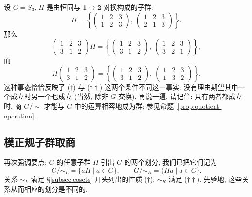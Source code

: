 \begin{example}
\label{ex:cosets-S3}
设 $G = S_3$, $H$ 是由恒同与 $\mathbf{1} \leftrightarrow \mathbf{2}$ 对换构成的子群:
\[
H = \left\{ \begin{pmatrix} 1 & 2 & 3 \\ 1 & 2 & 3 \end{pmatrix},\ \begin{pmatrix} 1 & 2 & 3 \\ 2 & 1 & 3 \end{pmatrix} \right\}.
\]
那么
\[
\begin{pmatrix} 1 & 2 & 3 \\ 3 & 1 & 2 \end{pmatrix} H = \left\{ \begin{pmatrix} 1 & 2 & 3 \\ 3 & 1 & 2 \end{pmatrix},\ \begin{pmatrix} 1 & 2 & 3 \\ 3 & 2 & 1 \end{pmatrix} \right\},
\]
而
\[
H \begin{pmatrix} 1 & 2 & 3 \\ 3 & 1 & 2 \end{pmatrix} = \left\{ \begin{pmatrix} 1 & 2 & 3 \\ 3 & 1 & 2 \end{pmatrix},\ \begin{pmatrix} 1 & 2 & 3 \\ 1 & 3 & 2 \end{pmatrix} \right\}.
\]
这种事态恰恰反映了 ($\dagger$) 与 ($\dagger\dagger$) 这两个条件不同这一事实: 没有理由期望其中一个成立时另一个也成立 (当然, 除非 $G$ 交换). 再说一遍, 请记住: 只有两者都成立时, 商 $G/{\sim}$ 才能与 $G$ 中的运算相容地成为群; 参见命题~\ref{prop:quotient-operation}.
\end{example}

\subsection{模正规子群取商}
\label{subsec:quotient-by-normal}

再次强调要点: $G$ 的任意子群 $H$ 引出 $G$ 的两个划分, 我们已把它们记为
\[
G/{\sim_L} = \{aH \mid a \in G\}, \qquad G/{\sim_R} = \{Ha \mid a \in G\}.
\]
关系 $\sim_L$ 满足 \S\ref{subsec:cosets} 开头列出的性质 ($\dagger$); $\sim_R$ 满足 ($\dagger\dagger$). 先验地, 这些关系从而相应的划分是不同的.

